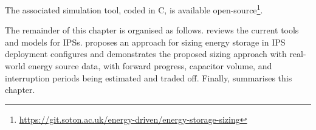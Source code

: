The associated simulation tool, coded in C, is available open-source\footnote{\url{https://git.soton.ac.uk/energy-driven/energy-storage-sizing}}. 

The remainder of this chapter is organised as follows. 
 reviews the current tools and models for IPSs. 
 proposes an approach for sizing energy storage in IPS deployment 
 configures and demonstrates the proposed sizing approach with real-world energy source data, with forward progress, capacitor volume, and interruption periods being estimated and traded off.  
Finally,  summarises this chapter. 
